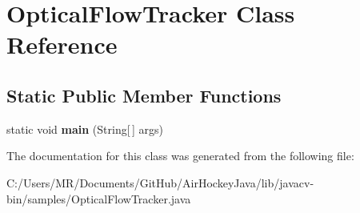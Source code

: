 \hypertarget{class_optical_flow_tracker}{}\section{Optical\+Flow\+Tracker Class Reference}
\label{class_optical_flow_tracker}
\subsection*{Static Public Member Functions}
\begin{DoxyCompactItemize}
\item 
\hypertarget{class_optical_flow_tracker_acf4b2c5fab6acaa45e732c05d3a64f92}{}static void {\bfseries main} (String\mbox{[}$\,$\mbox{]} args)\label{class_optical_flow_tracker_acf4b2c5fab6acaa45e732c05d3a64f92}

\end{DoxyCompactItemize}


The documentation for this class was generated from the following file\+:\begin{DoxyCompactItemize}
\item 
C\+:/\+Users/\+M\+R/\+Documents/\+Git\+Hub/\+Air\+Hockey\+Java/lib/javacv-\/bin/samples/Optical\+Flow\+Tracker.\+java\end{DoxyCompactItemize}
